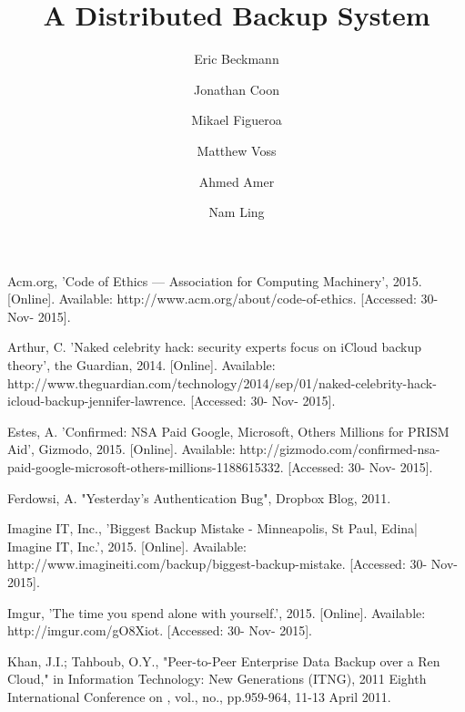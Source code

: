 \documentclass{scu-thesis}
\author{Eric Beckmann}
\author{Jonathan Coon}
\author{Mikael Figueroa}
\author{Matthew Voss}
\title{A Distributed Backup System}
\begin{document}
\frontmatter
\signature{Ahmed Amer}
\signature{Nam Ling}

\maketitle



\tableofcontents
\listoffigures

\mainmatter











%
%

\begin{thebibliography}{9}

Acm.org, 'Code of Ethics            —                Association for Computing Machinery', 2015. [Online]. Available: http://www.acm.org/about/code-of-ethics. [Accessed: 30- Nov- 2015].

Arthur, C. 'Naked celebrity hack: security experts focus on iCloud backup theory', the Guardian, 2014. [Online]. Available: http://www.theguardian.com/technology/2014/sep/01/naked-celebrity-hack-icloud-backup-jennifer-lawrence. [Accessed: 30- Nov- 2015].

Estes, A. 'Confirmed: NSA Paid Google, Microsoft, Others Millions for PRISM Aid', Gizmodo, 2015. [Online]. Available: http://gizmodo.com/confirmed-nsa-paid-google-microsoft-others-millions-1188615332. [Accessed: 30- Nov- 2015].

Ferdowsi, A. "Yesterday's Authentication Bug", Dropbox Blog, 2011.

Imagine IT, Inc., 'Biggest Backup Mistake - Minneapolis, St Paul, Edina| Imagine IT, Inc.', 2015. [Online]. Available: http://www.imagineiti.com/backup/biggest-backup-mistake. [Accessed: 30- Nov- 2015].

Imgur, 'The time you spend alone with yourself.', 2015. [Online]. Available: http://imgur.com/gO8Xiot. [Accessed: 30- Nov- 2015].

Khan, J.I.; Tahboub, O.Y., "Peer-to-Peer Enterprise Data Backup over a Ren Cloud," in Information Technology: New Generations (ITNG), 2011 Eighth International Conference on , vol., no., pp.959-964, 11-13 April 2011.


\end{thebibliography}
\end{document}

